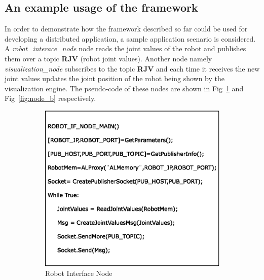 \subsection{An example usage of the framework}
In order to demonstrate how the framework described so far could be used for developing a distributed application, a sample application scenario is considered. A \emph{robot\_interace\_node} node reads the joint values of the robot and publishes them over a topic \textbf{RJV} (robot joint values). Another node namely \emph{visualization\_node} subscribes to the topic \textbf{RJV} and each time it receives the new joint values updates the joint position of the robot being shown by the visualization engine. The pseudo-code of these nodes are shown in Fig~\ref{fig:node_a} and Fig~\ref{fig:node_b} respectively.
\begin{figure}[H]
\begin{subfigure}[t]{0.48\textwidth}
\includegraphics[width=\textwidth]{assets/sample_node_A.eps}
\caption[Robot Interface Node]{Robot Interface Node}
\label{fig:node_a}
\end{subfigure}
\begin{subfigure}[t]{0.48\textwidth}

\end{subfigure}
\end{figure}
